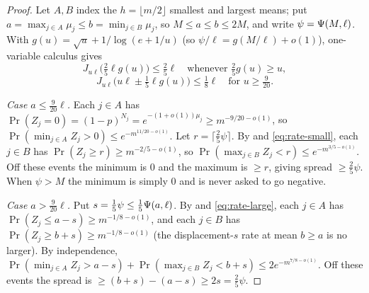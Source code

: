\begin{proof}
Let $A,B$ index the $h=\lfloor m/2\rfloor$ smallest and largest means; put $a=\max_{j\in A}\mu_j\le b=\min_{j\in B}\mu_j$, so
$M\le a\le b\le 2M$, and write $\psi=\Psi(M,\ell)$. With $g(u)=\sqrt u+1/\log(e+1/u)$ (so $\psi/\ell=g(M/\ell)+o(1)$),
one-variable calculus gives
\begin{equation}\label{eq:rate-small}
  J_{u\ell}\big(\tfrac25\ell g(u)\big)\le\tfrac25\ell\quad\text{whenever }\tfrac25 g(u)\ge u,
\end{equation}
\begin{equation}\label{eq:rate-large}
  J_{u\ell}\big(u\ell\pm\tfrac15\ell g(u)\big)\le\tfrac18\ell\quad\text{for }u\ge\tfrac{9}{20}.
\end{equation}

\emph{Case $a\le\tfrac{9}{20}\ell$.} Each $j\in A$ has $\Pr(Z_j=0)=(1-p)^{N_j}=e^{-(1+o(1))\mu_j}\ge m^{-9/20-o(1)}$, so
$\Pr(\min_{j\in A}Z_j>0)\le e^{-m^{11/20-o(1)}}$. Let $r=\lceil\tfrac25\psi\rceil$. By  and
\eqref{eq:rate-small}, each $j\in B$ has $\Pr(Z_j\ge r)\ge m^{-2/5-o(1)}$, so $\Pr(\max_{j\in B}Z_j<r)\le e^{-m^{3/5-o(1)}}$.
Off these events the minimum is $0$ and the maximum is $\ge r$, giving spread $\ge\tfrac25\psi$. When $\psi>M$ the minimum
is simply $0$ and is never asked to go negative.

\emph{Case $a>\tfrac{9}{20}\ell$.} Put $s=\tfrac15\psi\le\tfrac15\Psi(a,\ell)$. By  and
\eqref{eq:rate-large}, each $j\in A$ has $\Pr(Z_j\le a-s)\ge m^{-1/8-o(1)}$, and each $j\in B$ has $\Pr(Z_j\ge b+s)\ge
m^{-1/8-o(1)}$ (the displacement-$s$ rate at mean $b\ge a$ is no larger). By independence,
$\Pr(\min_{j\in A}Z_j>a-s)+\Pr(\max_{j\in B}Z_j<b+s)\le 2e^{-m^{7/8-o(1)}}$. Off these events the spread is
$\ge(b+s)-(a-s)\ge 2s=\tfrac25\psi$.
\end{proof}

